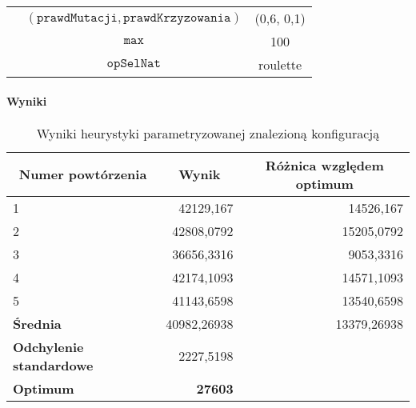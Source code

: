 \documentclass[twoside]{iisthesis}
\newcommand{\param}[1]{\mathtt{#1}}
\begin{document}
\begin{table}[h]
\begin{tabular}{c|c|c|}
		\multicolumn{1}{|c|}{}                                & $(\param{prawdMutacji}, \param{prawdKrzyzowania})$ & (0,6, 0,1)              \\ \cline{2-3} 
		\multicolumn{1}{|c|}{}                                & $\param{max}$                                      & 100                     \\ \cline{2-3} 
		\multicolumn{1}{|c|}{}                                & $\param{opSelNat}$                                 & roulette                \\ \hline
	\end{tabular}
\end{table}

\paragraph{Wyniki}

\begin{table}[h]
	\caption{Wyniki heurystyki parametryzowanej znalezioną konfiguracją \label{tsp_init_results}}
	\begin{tabular}{|l|r|r}
		\hline
		\multicolumn{1}{|c|}{{\bf Numer powtórzenia}} & \multicolumn{1}{c|}{{\bf Wynik}} & \multicolumn{1}{c|}{{\bf Różnica względem optimum}} \\ \hline \hline
		1                                             & 42129,167                        & \multicolumn{1}{r|}{14526,167}                      \\ \hline
		2                                             & 42808,0792                       & \multicolumn{1}{r|}{15205,0792}                     \\ \hline
		3                                             & 36656,3316                       & \multicolumn{1}{r|}{9053,3316}                      \\ \hline
		4                                             & 42174,1093                       & \multicolumn{1}{r|}{14571,1093}                     \\ \hline
		5                                             & 41143,6598                       & \multicolumn{1}{r|}{13540,6598}                     \\ \hline \hline
		{\bf Średnia}                                 & 40982,26938                      & \multicolumn{1}{r|}{13379,26938}                    \\ \hline
		{\bf Odchylenie standardowe}                  & 2227,5198                        &                       \\  \hhline{==~}
		{\bf Optimum}                                 & \multicolumn{1}{r|}{{\bf 27603}} & \multicolumn{1}{l}{}                                \\ \cline{1-2}
	\end{tabular}
\end{table}
\end{document}
